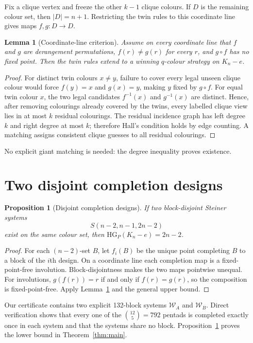 \documentclass[11pt]{article}
\newtheorem{lemma}{Lemma}
\newtheorem{proposition}{Proposition}
\newcommand{\HGP}{\mathrm{HG}_{P}}
\begin{document}
Fix a clique vertex and freeze the other $k-1$ clique colours. If $D$ is the
remaining colour set, then $|D|=n+1$. Restricting the twin rules to this
coordinate line gives maps $f,g:D\to D$.

\begin{lemma}[Coordinate-line criterion]\label{lem:line}
Assume on every coordinate line that $f$ and $g$ are derangement
permutations, $f(r)\ne g(r)$ for every $r$, and $g\circ f$ has no fixed
point. Then the twin rules extend to a winning $q$-colour strategy on
$K_n-e$.
\end{lemma}

\begin{proof}
For distinct twin colours $x\ne y$, failure to cover every legal unseen clique
colour would force $f(y)=x$ and $g(x)=y$, making $y$ fixed by $g\circ f$.
For equal twin colour $x$, the two legal candidates $f^{-1}(x)$ and
$g^{-1}(x)$ are distinct. Hence, after removing colourings already covered by
the twins, every labelled clique view lies in at most $k$ residual colourings.
The residual incidence graph has left degree $k$ and right degree at most $k$;
therefore Hall's condition holds by edge counting. A matching assigns
consistent clique guesses to all residual colourings.
\end{proof}

No explicit giant matching is needed: the degree inequality proves existence.

\section{Two disjoint completion designs}
\begin{proposition}[Disjoint completion designs]\label{prop:design}
If two block-disjoint Steiner systems
\[
 S(n-2,n-1,2n-2)
\]
exist on the same colour set, then $\HGP(K_n-e)=2n-2$.
\end{proposition}
\begin{proof}
For each $(n-2)$-set $B$, let $f_i(B)$ be the unique point completing $B$ to
a block of the $i$th design. On a coordinate line each completion map is a
fixed-point-free involution. Block-disjointness makes the two maps pointwise
unequal. For involutions, $g(f(r))=r$ if and only if $f(r)=g(r)$, so the
composition is fixed-point-free. Apply Lemma~\ref{lem:line} and the general
upper bound.
\end{proof}

Our certificate contains two explicit 132-block systems $\mathcal W_A$ and
$\mathcal W_B$. Direct verification shows that every one of the
$\binom{12}{5}=792$ pentads is completed exactly once in each system and that
the systems share no block. Proposition~\ref{prop:design} proves the lower
bound in Theorem~\ref{thm:main}.
\end{document}
